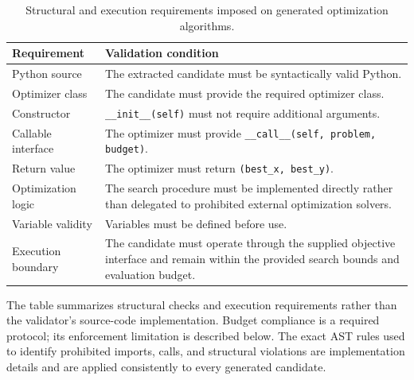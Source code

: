 \begin{table}[htbp]
    \centering
    \caption{Structural and execution requirements imposed on generated
    optimization algorithms.}
    \label{tab:validation_requirements}

    \begin{tabular}{|p{}|p{}|}
        \hline
        \textbf{Requirement} & \textbf{Validation condition} \\
        \hline

        Python source &
        The extracted candidate must be syntactically valid Python. \\
        \hline

        Optimizer class &
        The candidate must provide the required optimizer class. \\
        \hline

        Constructor &
        \texttt{\_\_init\_\_(self)} must not require additional arguments. \\
        \hline

        Callable interface &
        The optimizer must provide
        \texttt{\_\_call\_\_(self, problem, budget)}. \\
        \hline

        Return value &
        The optimizer must return
        \texttt{(best\_x, best\_y)}. \\
        \hline

        Optimization logic &
        The search procedure must be implemented directly rather than
        delegated to prohibited external optimization solvers. \\
        \hline

        Variable validity &
        Variables must be defined before use. \\
        \hline

        Execution boundary &
        The candidate must operate through the supplied objective interface
        and remain within the provided search bounds and evaluation budget. \\
        \hline
    \end{tabular}
\end{table}

The table summarizes structural checks and execution requirements rather
than the validator's source-code implementation. Budget compliance is a
required protocol; its enforcement limitation is described below. The exact AST rules used to identify prohibited
imports, calls, and structural violations are implementation details and are
applied consistently to every generated candidate.

